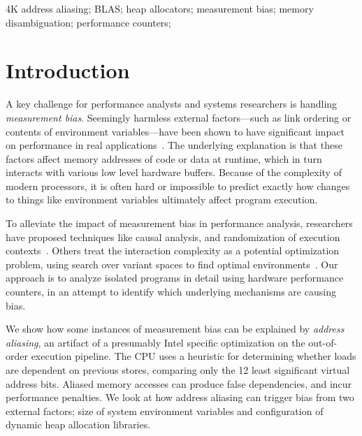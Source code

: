 \documentclass[10pt, conference, compsocconf]{IEEEtran}
\begin{document}
\begin{IEEEkeywords}
4K address aliasing; BLAS; heap allocators; measurement bias; memory disambiguation; performance counters;
\end{IEEEkeywords}


\section{Introduction}
A key challenge for performance analysts and systems researchers is handling \emph{measurement bias}.
Seemingly harmless external factors---such as link ordering or contents of environment variables---have been shown to have significant impact on performance in real applications~\cite{Mytkowicz:2009:WrongData}.
The underlying explanation is that these factors affect memory addresses of code or data at runtime, which in turn interacts with various low level hardware buffers.
Because of the complexity of modern processors, it is often hard or impossible to predict exactly how changes to things like environment variables ultimately affect program execution.

To alleviate the impact of measurement bias in performance analysis, researchers have proposed techniques like causal analysis, and randomization of execution contexts~\cite{Mytkowicz:2008:OE&MB}.
Others treat the interaction complexity as a potential optimization problem, using search over variant spaces to find optimal environments~\cite{Knights:2009:BlindOpt}.
Our approach is to analyze isolated programs in detail using hardware performance counters, in an attempt to identify which underlying mechanisms are causing bias.

We show how some instances of measurement bias can be explained by \emph{address aliasing}, an artifact of a presumably Intel specific optimization on the out-of-order execution pipeline.
The CPU uses a heuristic for determining whether loads are dependent on previous stores, comparing only the 12 least significant virtual address bits.
Aliased memory accesses can produce false dependencies, and incur performance penalties.
We look at how address aliasing can trigger bias from two external factors; size of system environment variables and configuration of dynamic heap allocation libraries.
\end{document}
